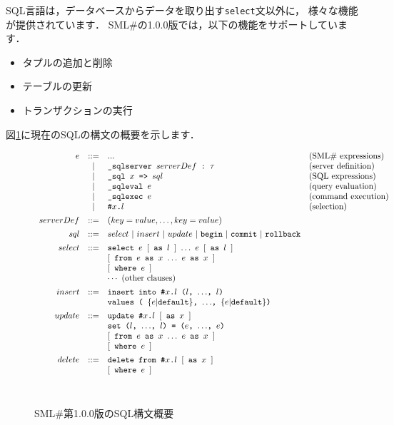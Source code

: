 \documentclass{jbook}
\newcommand{\smlsharp}{SML\#}
\newcommand{\version}{1.0.0}
\newcommand{\vbar}{\mbox{\ |\ }}
\newcommand{\code}[1]{\mbox{{\tt #1}}}
\begin{document}
\ifx\jp%
	SQL言語は，データベースからデータを取り出す{\tt select}文以外に，
様々な機能が提供されています．
	\smlsharp{}の\version{}版では，以下の機能をサポートしています．
\begin{itemize}
\item タプルの追加と削除
\item テーブルの更新
\item トランザクションの実行
\end{itemize}
	図\ref{fig:sqlSyntax}に現在のSQLの構文の概要を示します．
\begin{figure}
\begin{center}
\[
\begin{array}{rcll}
  e &::=& ... & \mbox{(\smlsharp{} expressions)}
\\  &|& \code{\_sqlserver $serverDef$~:~$\tau$} 
	& \mbox{(server definition)}
\\  &|& \code{\_sql $x$ => $sql$} 
	& \mbox{(SQL expressions)}
\\  &|& \code{\_sqleval $e$}
	& \mbox{(query evaluation)}
\\  &|& \code{\_sqlexec $e$}
	& \mbox{(command execution)}
\\  &|& \code{\#$x$.$l$}
	& \mbox{(selection)}
\\[1ex]
serverDef &::=& (key = value,\ldots,key = value)
\\[1ex]
  sql &::=& select
\vbar insert
\vbar update
\vbar \code{begin}
\vbar \code{commit}
\vbar \code{rollback}
\\[1ex]
select &::=& 
     \code{select $e$ $[$ as $l$ $]$ $\ldots$ $e$ $[$ as $l$ $]$}
\\&& \code{$[$ from $e$ as $x$ $\ldots$ $e$ as $x$ $]$}
\\&& \code{$[$ where $e$ $]$}
\\&& \cdots\ \mbox{(other clauses)}
\\[1ex]
insert &::=& 
\code{insert into \#$x$.$l$ ($l$, $\ldots$, $l$)}
\\&& \code{values ( $\{e|$default$\}$, $\ldots$, $\{e|$default$\}$)}
\\[1ex]
update &::=& 
   \code{update \#$x$.$l$ $[$ as $x$ $]$}
\\&& \code{set ($l$, $\ldots$, $l$) = ($e$, $\ldots$, $e$)}
\\&& \code{$[$ from $e$ as $x$ $\ldots$ $e$ as $x$ $]$}
\\&& \code{$[$ where $e$ $]$}
\\[1ex]
delete &::=& 
   \code{delete from \#$x$.$l$ $[$ as $x$ $]$}
\\&& \code{$[$ where $e$ $]$}
\end{array}
\]
\ \\
\caption{\smlsharp{}第\version{}版のSQL構文概要}
\end{center}
\label{fig:sqlSyntax}
\end{figure}
\end{document}
